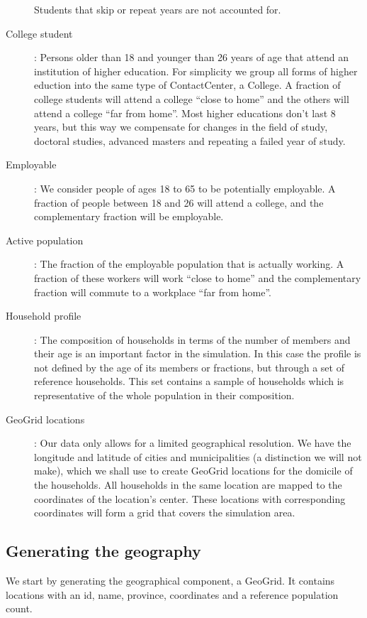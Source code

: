 \begin{description}
    		Students that skip or repeat years are not accounted for.
    \item[College student]:
        Persons older than 18 and younger than 26 years of age that attend an institution of higher education. 
        For simplicity we group all forms of higher eduction into the same type of ContactCenter, a College. 
        A fraction of college students will attend a college ``close to home'' and the others will attend a 
        college ``far from home''. Most higher educations don't last 8 years, but this way we compensate 
        for changes in the field of study, doctoral studies, advanced masters and repeating a failed year of study.
    \item[Employable]:
        We consider people of ages 18 to 65 to be potentially employable. A fraction of people between 18 and 26 
        will attend a college, and the complementary fraction will be employable.
    \item[Active population]:
        The fraction of the employable population that is actually working. A fraction of these workers will 
        work ``close to home'' and the complementary fraction will commute to a workplace ``far from home''.
    \item[Household profile]:
        The composition of households in terms of the number of members and their age is an important 
        factor in the simulation. In this case the profile is not defined by the age of its members or fractions, 
        but through a set of reference households. This set contains a sample of households which is 
        representative of the whole population in their composition.
    \item[GeoGrid locations]:
        Our data only allows for a limited geographical resolution. We have the longitude and latitude of cities 
        and municipalities (a distinction we will not make), which we shall use to create GeoGrid locations for 
        the domicile of the households. All households in the same location are mapped to the coordinates 
        of the location's center. These locations with corresponding coordinates will form a grid that covers 
        the simulation area.
\end{description}

\subsection{Generating the geography}
\label{subsection:gengeo}
We start by generating the geographical component, a GeoGrid.
It contains locations with an id, name, province, coordinates and a reference population count.

